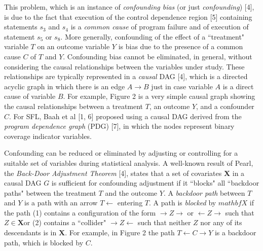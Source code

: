 This problem, which is an instance of {\it confounding bias} (or just {\it confounding}) [4], is due to the fact that execution of the control dependence region [5] containing statements $s_3$ and $s_4$ is a {\it common cause} of program failure and of execution of statement $s_5$ or $s_8$.  More generally, confounding of the effect of a ``treatment" variable $T$ on an outcome variable $Y$ is bias due to the presence of a common cause $C$ of $T$ and $Y$.  Confounding bias cannot be eliminated, in general, without considering the causal relationships between the variables under study.  These relationships are typically represented in a {\it causal} DAG [4], which is a directed acyclic graph in which there is an edge $A \rightarrow B$ just in case variable $A$ is a direct cause of variable $B$.  For example, Figure 2 is a very simple causal graph showing the causal relationships between a treatment $T$, an outcome $Y$, and a confounder $C$.  For SFL, Baah et al [1, 6] proposed using a causal DAG derived from the {\it program dependence graph} (PDG) [7], in which the nodes represent binary coverage indicator variables.

Confounding can be reduced or eliminated by adjusting or controlling for a suitable set of variables during statistical analysis.  A well-known result of Pearl, the {\it Back-Door Adjustment Theorem} [4], states that a set of covariates $\mathbf{X}$ in a causal DAG $G$ is sufficient for confounding adjustment if it ``blocks" all ``backdoor paths" between the treatment $T$ and the outcome $Y$.  A {\it backdoor path} between $T$ and $Y$ is a path with an arrow $T \leftarrow$ entering $T$.  A path is {\it blocked} by $mathbf{X}$ if the path (1) contains a configuration of the form $\rightarrow Z \rightarrow$ or $\leftarrow Z \rightarrow$ such that  $Z \in \mathbf{X}$or (2) contains a ``collider" $\rightarrow Z \leftarrow$  such that neither $Z$ nor any of its descendants is in $\mathbf{X}$.  For example, in Figure 2 the path $T \leftarrow C \rightarrow Y$ is a backdoor path, which is blocked by $C$.


